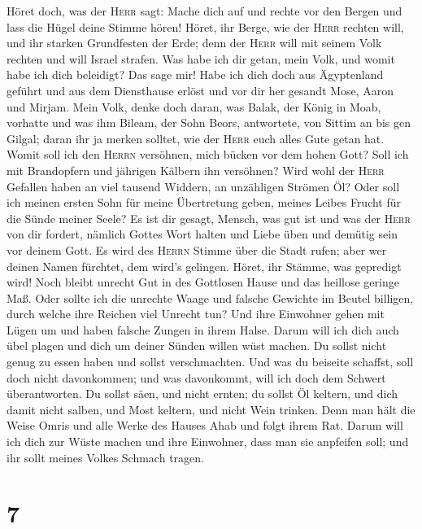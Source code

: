  Höret doch, was der \textsc{Herr} sagt: Mache dich auf
und rechte vor den Bergen und lass die Hügel deine Stimme hören!
 Höret, ihr Berge, wie der \textsc{Herr} rechten will, und
ihr starken Grundfesten der Erde; denn der \textsc{Herr} will mit seinem
Volk rechten und will Israel strafen.  Was habe ich dir
getan, mein Volk, und womit habe ich dich beleidigt? Das sage mir!
 Habe ich dich doch aus Ägyptenland geführt und aus dem
Diensthause erlöst und vor dir her gesandt Mose, Aaron und Mirjam.
 Mein Volk, denke doch daran, was Balak, der König in
Moab, vorhatte und was ihm Bileam, der Sohn Beors, antwortete, von
Sittim an bis gen Gilgal; daran ihr ja merken solltet, wie der
\textsc{Herr} euch alles Gute getan hat.  Womit soll ich
den \textsc{Herrn} versöhnen, mich bücken vor dem hohen Gott? Soll ich
mit Brandopfern und jährigen Kälbern ihn versöhnen?  Wird
wohl der \textsc{Herr} Gefallen haben an viel tausend Widdern, an
unzähligen Strömen Öl? Oder soll ich meinen ersten Sohn für meine
Übertretung geben, meines Leibes Frucht für die Sünde meiner Seele?
 Es ist dir gesagt, Mensch, was gut ist und was der
\textsc{Herr} von dir fordert, nämlich Gottes Wort halten und Liebe üben
und demütig sein vor deinem Gott.  Es wird des
\textsc{Herrn} Stimme über die Stadt rufen; aber wer deinen Namen
fürchtet, dem wird's gelingen. Höret, ihr Stämme, was gepredigt wird!
 Noch bleibt unrecht Gut in des Gottlosen Hause und das
heillose geringe Maß.  Oder sollte ich die unrechte Waage
und falsche Gewichte im Beutel billigen,  durch welche
ihre Reichen viel Unrecht tun? Und ihre Einwohner gehen mit Lügen um und
haben falsche Zungen in ihrem Halse.  Darum will ich dich
auch übel plagen und dich um deiner Sünden willen wüst machen.
 Du sollst nicht genug zu essen haben und sollst
verschmachten. Und was du beiseite schaffst, soll doch nicht
davonkommen; und was davonkommt, will ich doch dem Schwert
überantworten.  Du sollst säen, und nicht ernten; du
sollst Öl keltern, und dich damit nicht salben, und Most keltern, und
nicht Wein trinken.  Denn man hält die Weise Omris und
alle Werke des Hauses Ahab und folgt ihrem Rat. Darum will ich dich zur
Wüste machen und ihre Einwohner, dass man sie anpfeifen soll; und ihr
sollt meines Volkes Schmach tragen.

\hypertarget{section-6}{%
\section{7}\label{section-6}}

